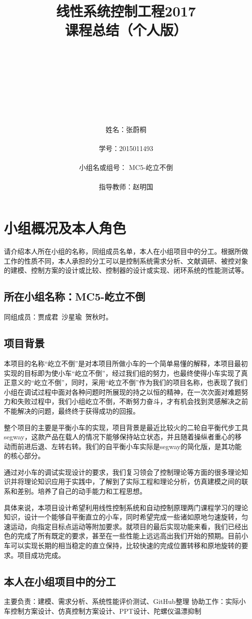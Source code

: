 \documentclass[UTF8,a4paper]{paper}
\title{线性系统控制工程2017\\ 课程总结（个人版）}
\author{\\ \\ \\ \\ \\ \\ \\ \\ 姓名：张蔚桐\\ \\ 学号：2015011493\\ \\  
小组名或组号： MC5-屹立不倒\\ \\ 指导教师：赵明国\\ }
\begin{document}
\maketitle\clearpage
\tableofcontents\clearpage
\section{小组概况及本人角色}
请介绍本人所在小组的名称，同组成员名单，本人在小组项目中的分工。根据所做工作的性质不同，本人承担的分工可以是控制系统需求分析、文献调研、被控对象的建模、控制方案的设计或比较、控制器的设计或实现、闭环系统的性能测试等。
\subsection{所在小组名称：MC5-屹立不倒}
同组成员：贾成君\ 沙星瑜\ 贺秋时。
\subsection{项目背景}
本项目的名称“屹立不倒”是对本项目所做小车的一个简单易懂的解释，本项目最初实现的目标即为使小车“屹立不倒”，经过我们组的努力，也最终使得小车实现了真正意义的“屹立不倒”，同时，采用“屹立不倒”作为我们的项目名称，也表现了我们小组在调试过程中面对各种问题时所展现的持之以恒的精神，在一次次面对难题努力和失败过程中，我们小组屹立不倒，不断努力奋斗，才有机会找到灵感解决之前不能解决的问题，最终终于获得成功的回报。

整个项目的主要是平衡小车的实现，项目背景是最近比较火的二轮自平衡代步工具segway，这款产品在载人的情况下能够保持站立状态，并且随着操纵者重心的移动而前进后退、左转右转。我们的自平衡小车实际是segway的简化版，是其功能的核心部分。

通过对小车的调试实现设计的要求，我们复习领会了控制理论等方面的很多理论知识并将理论知识应用于实践中，了解到了实际工程和理论分析，仿真建模之间的联系和差别。培养了自己的动手能力和工程思想。

具体来说，本项目设计希望利用线性控制系统和自动控制原理两门课程学习的理论知识，设计一个能够自平衡直立的小车，同时希望完成一些诸如原地匀速旋转，匀速运动，向指定目标点运动等附加要求。就项目的最后实现功能来看，我们已经出色的完成了所有既定的要求，甚至在一些性能上远远高出我们开始的预期。目前小车可以实现长期的相当稳定的直立保持，比较快速的完成位置转移和原地旋转的要求。项目成功完成。
\subsection{本人在小组项目中的分工}
主要负责：建模、需求分析、系统性能评价测试、GitHub整理
协助工作：实际小车控制方案设计、仿真控制方案设计、PPT设计、陀螺仪温漂抑制
\end{document}

